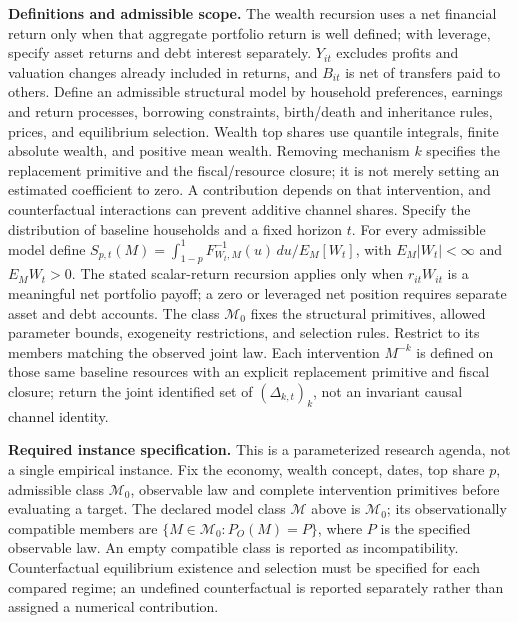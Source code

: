 \documentclass[11pt,a4paper]{article}
\begin{document}
\textbf{Definitions and admissible scope.} The wealth recursion uses a net financial return only when that aggregate portfolio return is well defined; with leverage, specify asset returns and debt interest separately. \(Y_{it}\) excludes profits and valuation changes already included in returns, and \(B_{it}\) is net of transfers paid to others. Define an admissible structural model by household preferences, earnings and return processes, borrowing constraints, birth/death and inheritance rules, prices, and equilibrium selection. Wealth top shares use quantile integrals, finite absolute wealth, and positive mean wealth. Removing mechanism \(k\) specifies the replacement primitive and the fiscal/resource closure; it is not merely setting an estimated coefficient to zero. A contribution depends on that intervention, and counterfactual interactions can prevent additive channel shares. Specify the distribution of baseline households and a fixed horizon \(t\). For every admissible model define \(S_{p,t}(M)=\int_{1-p}^1F^{-1}_{W_t,M}(u)\,du/E_M[W_t]\), with \(E_M|W_t|<\infty\) and \(E_MW_t>0\). The stated scalar-return recursion applies only when \(r_{it}W_{it}\) is a meaningful net portfolio payoff; a zero or leveraged net position requires separate asset and debt accounts. The class \(\mathcal M_0\) fixes the structural primitives, allowed parameter bounds, exogeneity restrictions, and selection rules. Restrict to its members matching the observed joint law. Each intervention \(M^{-k}\) is defined on those same baseline resources with an explicit replacement primitive and fiscal closure; return the joint identified set of \((\Delta_{k,t})_k\), not an invariant causal channel identity.

\textbf{Required instance specification.} This is a parameterized research agenda, not a single empirical instance. Fix the economy, wealth concept, dates, top share \(p\), admissible class \(\mathcal M_0\), observable law and complete intervention primitives before evaluating a target. The declared model class \(\mathcal M\) above is \(\mathcal M_0\); its observationally compatible members are \(\{M\in\mathcal M_0:P_O(M)=P\}\), where \(P\) is the specified observable law. An empty compatible class is reported as incompatibility. Counterfactual equilibrium existence and selection must be specified for each compared regime; an undefined counterfactual is reported separately rather than assigned a numerical contribution.
\end{document}
